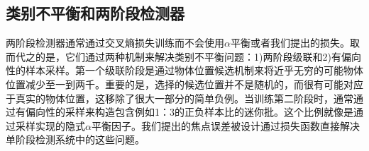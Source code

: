 \documentclass{ctexart}
\begin{document}
\subsection{类别不平衡和两阶段检测器}
两阶段检测器通常通过交叉熵损失训练而不会使用$\alpha$平衡或者我们提出的损失。取而代之的是，它们通过两种机制来解决类别不平衡问题：1)两阶段级联和2)有偏向性的样本采样。第一个级联阶段是通过物体位置候选机制来将近乎无穷的可能物体位置减少至一到两千。重要的是，选择的候选位置并不是随机的，而很有可能对应于真实的物体位置，这移除了很大一部分的简单负例。当训练第二阶段时，通常通过有偏向性的采样来构造包含例如1：3的正负样本比的迷你批。这个比例就像是通过采样实现的隐式$\alpha$平衡因子。我们提出的焦点误差被设计通过损失函数直接解决单阶段检测系统中的这些问题。
\end{document}
